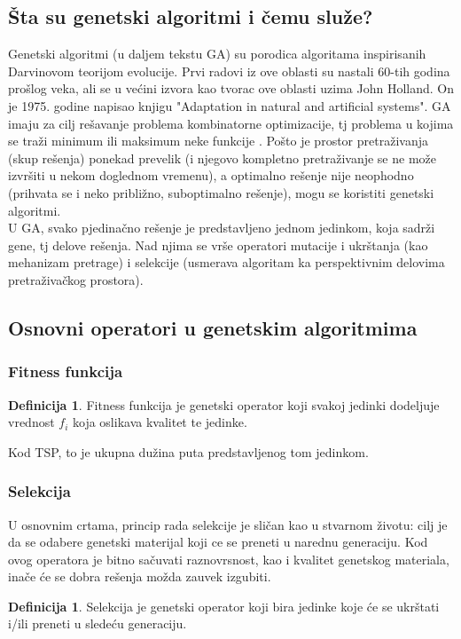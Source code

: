 \documentclass[titlepage]{article}
\theoremstyle{remark}
\theoremstyle{definition}
\newtheorem{df}[thm]{Definicija}
\begin{document}
    	\subsection{\v{S}ta su genetski algoritmi i \v{c}emu slu\v{z}e?}
    		Genetski algoritmi (u daljem tekstu GA) su porodica algoritama inspirisanih Darvinovom teorijom evolucije. Prvi radovi iz ove oblasti su nastali 60-tih godina pro\v{s}log veka, ali se u ve\'{c}ini izvora kao tvorac ove oblasti uzima John Holland. On je 1975. godine napisao knjigu "Adaptation in natural and artificial systems".
        GA imaju za cilj re\v{s}avanje problema kombinatorne optimizacije, tj problema u kojima se tra\v{z}i minimum ili maksimum neke funkcije . Po\v{s}to je prostor pretra\v{z}ivanja (skup re\v{s}enja) ponekad prevelik (i njegovo kompletno pretra\v{z}ivanje se ne mo\v{z}e izvr\v{s}iti u nekom doglednom vremenu), a optimalno re\v{s}enje nije neophodno (prihvata se i neko pribli\v{z}no, suboptimalno re\v{s}enje), mogu se koristiti genetski algoritmi. \\
      U GA, svako pjedina\v{c}no re\v{s}enje je predstavljeno jednom jedinkom, koja sadr\v{z}i gene, tj delove re\v{s}enja. Nad njima se vr\v{s}e operatori mutacije i ukr\v{s}tanja (kao mehanizam pretrage) i selekcije (usmerava algoritam ka perspektivnim delovima pretra\v{z}iva\v{c}kog prostora).

    	\subsection{Osnovni operatori u genetskim algoritmima}
            \subsubsection{Fitness funkcija}
            \begin{df}
                Fitness funkcija je genetski operator koji svakoj jedinki dodeljuje vrednost $f_i$ koja oslikava kvalitet te jedinke.
            \end{df}
            Kod TSP, to je ukupna du\v{z}ina puta predstavljenog tom jedinkom.
            \subsubsection{Selekcija}
            U osnovnim crtama, princip rada selekcije je sli\v{c}an kao u stvarnom \v{z}ivotu: cilj je da se odabere genetski materijal koji ce se preneti u narednu generaciju. Kod ovog operatora je bitno sa\v{c}uvati raznovrsnost, kao i kvalitet genetskog materiala, ina\v{c}e \'{c}e se dobra re\v{s}enja mo\v{z}da zauvek izgubiti.
            \begin{df}
                Selekcija je genetski operator koji bira jedinke koje \'{c}e se ukr\v{s}tati i/ili preneti u slede\'{c}u generaciju.
            \end{df}
\end{document}
